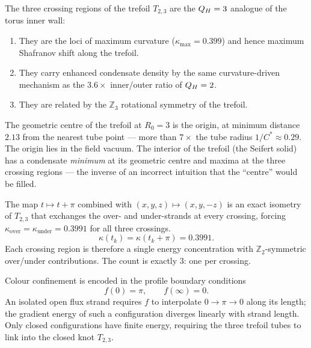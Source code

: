 \begin{proposition}
\label{P15:prop:crossings}
The three crossing regions of the trefoil $T_{2,3}$ are the
$Q_H=3$ analogue of the torus inner wall:
\begin{enumerate}[noitemsep,label=(\roman*)]
\item They are the loci of maximum curvature ($\kappa_{\max}=0.399$)
  and hence maximum Shafranov shift along the trefoil.
\item They carry enhanced condensate density by the same
  curvature-driven mechanism as the $3.6\times$ inner/outer ratio
  of $Q_H=2$.
\item They are related by the $\mathbb{Z}_3$ rotational symmetry
  of the trefoil.
\end{enumerate}
\end{proposition}

\begin{remark}
\label{P15:rem:geometric_centre_vacuum}
The geometric centre of the trefoil at $R_0=3$ is the origin,
at minimum distance $2.13$ from the nearest tube point --- more
than $7\times$ the tube radius $1/C^*\approx 0.29$.
The origin lies in the field vacuum.
The interior of the trefoil (the Seifert solid) has a condensate
\emph{minimum} at its geometric centre and maxima at the three
crossing regions --- the inverse of an incorrect intuition that
the ``centre'' would be filled.
\end{remark}

\begin{remark}
\label{P15:rem:3or6}
The map $t\mapsto t+\pi$ combined with $(x,y,z)\mapsto(x,y,-z)$
is an exact isometry of $T_{2,3}$ that exchanges the over- and under-strands
at every crossing, forcing $\kappa_{\mathrm{over}}=\kappa_{\mathrm{under}}=0.3991$
for all three crossings.
\begin{equation}
  \kappa(t_k)=\kappa(t_k+\pi)=0.3991.
  \label{P15:eq:kappa_equal}
\end{equation}
Each crossing region is therefore a single energy concentration
with $\mathbb{Z}_2$-symmetric over/under contributions.
The count is exactly $3$: one per crossing.
\end{remark}

\begin{proposition}
\label{P15:prop:confinement}
Colour confinement is encoded in the profile boundary conditions
\begin{equation}
  f(0) = \pi,\qquad f(\infty) = 0.
  \label{P15:eq:BC}
\end{equation}
An isolated open flux strand requires $f$ to interpolate $0\to\pi\to0$
along its length; the gradient energy of such a configuration diverges
linearly with strand length.
Only closed configurations have finite energy, requiring the three
trefoil tubes to link into the closed knot $T_{2,3}$.
\end{proposition}

